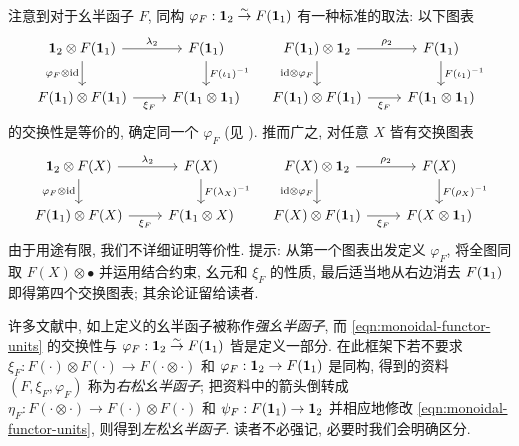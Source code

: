注意到对于幺半函子 $F$, 同构 $\varphi_F: \mathbf{1}_2 \stackrel{\sim}{\rightarrow} F(\mathbf{1}_1)$ 有一种标准的取法: 以下图表
\begin{equation} \begin{tikzcd}
	\munit_2 \otimes F(\munit_1) \arrow[r, "{\lambda_2}"] \arrow[d, "{\varphi_F \otimes \identity}"'] & F(\munit_1) \arrow[d, "{F(\iota_1)^{-1}}"] \\
	F(\munit_1) \otimes F(\munit_1) \arrow[r, "{\xi_F}"'] & F(\munit_1 \otimes \munit_1)
\end{tikzcd} \quad
\begin{tikzcd}
	F(\munit_1) \otimes \munit_2  \arrow[r, "{\rho_2}"] \arrow[d, "{\identity \otimes \varphi_F}"'] & F(\munit_1) \arrow[d, "{F(\iota_1)^{-1}}"] \\
	F(\munit_1) \otimes F(\munit_1) \arrow[r, "{\xi_F}"'] & F(\munit_1 \otimes \munit_1)
\end{tikzcd} \end{equation}
的交换性是等价的, 确定同一个 $\varphi_F$ (见 \cite[Proposition 2.4.3]{EGNO15}). 推而广之, 对任意 $X$ 皆有交换图表
\begin{equation}\label{eqn:monoidal-functor-units} \begin{tikzcd}
	\munit_2 \otimes F(X) \arrow[r, "{\lambda_2}"] \arrow[d, "{\varphi_F \otimes \identity}"'] & F(X) \arrow[d, "{F(\lambda_X)^{-1}}"] \\
	F(\munit_1) \otimes F(X) \arrow[r, "{\xi_F}"'] & F(\munit_1 \otimes X)
\end{tikzcd} \quad
\begin{tikzcd}
	F(X) \otimes \munit_2 \arrow[r, "{\rho_2}"] \arrow[d, "{\identity \otimes \varphi_F}"'] & F(X) \arrow[d, "{F(\rho_X)^{-1}}"] \\
	F(X) \otimes F(\munit_1) \arrow[r, "{\xi_F}"'] & F(X \otimes \munit_1)
\end{tikzcd} \end{equation}
由于用途有限, 我们不详细证明等价性. 提示: 从第一个图表出发定义 $\varphi_F$, 将全图同取 $F(X) \otimes \bullet$ 并运用结合约束, 幺元和 $\xi_F$ 的性质, 最后适当地从右边消去 $F(\mathbf{1}_1)$ 即得第四个交换图表; 其余论证留给读者.

\begin{remark}
	许多文献中, 如上定义的幺半函子被称作\emph{强幺半函子}, 而 \eqref{eqn:monoidal-functor-units} 的交换性与 $\varphi_F: \mathbf{1}_2 \stackrel{\sim}{\rightarrow} F(\mathbf{1}_1)$ 皆是定义一部分. 在此框架下若不要求 $\xi_F: F(\cdot) \otimes F(\cdot) \to F(\cdot \otimes \cdot)$ 和 $\varphi_F: \mathbf{1}_2 \to F(\mathbf{1}_1)$ 是同构, 得到的资料 $(F, \xi_F, \varphi_F)$ 称为\emph{右松幺半函子}; 把资料中的箭头倒转成 $\eta_F: F(\cdot \otimes \cdot) \to F(\cdot) \otimes F(\cdot)$ 和 $\psi_F: F(\mathbf{1}_1) \to \mathbf{1}_2$ 并相应地修改 \eqref{eqn:monoidal-functor-units}, 则得到\emph{左松幺半函子}. 读者不必强记, 必要时我们会明确区分. 
\end{remark}


